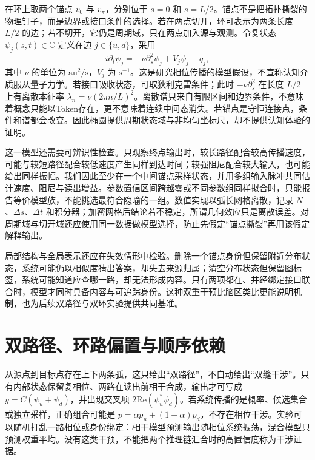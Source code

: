 在环上取两个锚点 $v_0$ 与 $v_\pi$，分别位于 $s=0$ 和 $s=L/2$。锚点不是把拓扑撕裂的物理钉子，而是边界或接口条件的选择。若在两点切开，环可表示为两条长度 $L/2$ 的边；若不切开，它仍是周期域，只在两点加入源与观测。令复状态 $\psi_j(s,t)\in\mathbb C$ 定义在边 $j\in\{u,d\}$，采用
\begin{equation}
 i\partial_t\psi_j=-\nu\partial_s^2\psi_j+V_j\psi_j+q_j ,
\end{equation}
其中 $\nu$ 的单位为 $\mathrm{au}^2/\mathrm{s}$，$V_j$ 为 $\mathrm{s}^{-1}$。这是研究相位传播的模型假设，不宣称认知介质服从量子力学。若接口吸收状态，可取狄利克雷条件；此时 $-\nu\partial_s^2$ 在长度 $L/2$ 上有离散本征率 $\lambda_n=\nu(2\pi n/L)^2$。离散谱只来自有限区间和边界条件，不意味着概念只能以Token存在，更不意味着连续中间态消失。若锚点是守恒连接点，条件和谱都会改变。因此椭圆提供周期状态域与非均匀坐标尺，却不提供认知体验的证明。

这一模型还需要可辨识性检查。只观察终点输出时，较长路径配合较高传播速度，可能与较短路径配合较低速度产生同样到达时间；较强阻尼配合较大输入，也可能给出同样振幅。我们因此至少在一个中间锚点采样状态，并用多组输入脉冲共同估计速度、阻尼与读出增益。参数置信区间跨越零或不同参数组同样拟合时，只能报告等价模型族，不能挑选最符合隐喻的一组。数值实现以弧长网格离散，记录 $N$、$\Delta s$、$\Delta t$ 和积分器；加密网格后结论若不稳定，所谓几何效应只是离散误差。对周期域与切开域还应使用同一数据做模型选择，防止先假定“锚点撕裂”再用该假定解释输出。

局部结构与全局表示还应在失效情形中检验。删除一个锚点身份但保留附近分布状态，系统可能仍以相似度猜出答案，却失去来源归属；清空分布状态但保留图标签，系统可能知道应查哪一路，却无法形成内容。只有两项都在、并经绑定接口联合时，模型才同时具备内容与可追踪身份。这种双重干预比脑区类比更能说明机制，也为后续双路径与双环实验提供共同基准。

\section{双路径、环路偏置与顺序依赖}
\label{sec:micro_anchoring_free_evolution}
\label{sec:gauge_field_ab_effect}

从源点到目标点存在上下两条弧，这只给出“双路径”，不自动给出“双缝干涉”。只有内部状态保留复相位、两路在读出前相干合成，输出才可写成 $y=C(\psi_u+\psi_d)$，并出现交叉项 $2\mathrm{Re}(\psi_u^*\psi_d)$。若系统传播的是概率、候选集合或独立采样，正确组合可能是 $p=\alpha p_u+(1-\alpha)p_d$，不存在相位干涉。实验可以随机打乱一路相位或身份绑定：相干模型预测输出随相位系统振荡，混合模型只预测权重平均。没有这类干预，不能把两个推理链汇合时的高置信度称为干涉证据。

